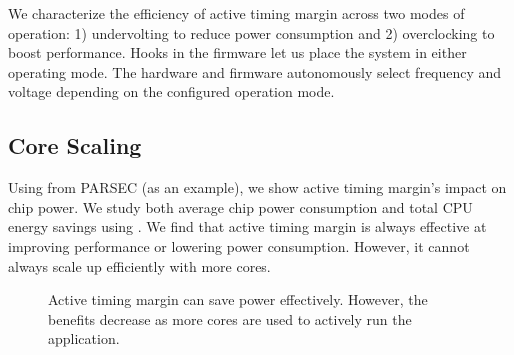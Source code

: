 We characterize the efficiency of active timing margin across two modes of operation: 1) undervolting to reduce power consumption and 2) overclocking to boost performance. Hooks in the firmware let us place the system in either operating mode. The hardware and firmware autonomously select frequency and voltage depending on the configured operation mode.

\subsection{Core Scaling}
\label{sec:voltage:characterization:scaling-trends}
Using  from PARSEC (as an example), we show active timing margin's impact on chip power. We study both average chip power consumption and total CPU energy savings using . We find that active timing margin is always effective at improving performance or lowering power consumption. However, it cannot always scale up efficiently with more cores. 

\begin{figure}[t]
	\centering
    \caption{Active timing margin can save power effectively. However, the benefits decrease as more cores are used to actively run the application.}
    \label{fig:raytrace-inefficiency}
\end{figure}

